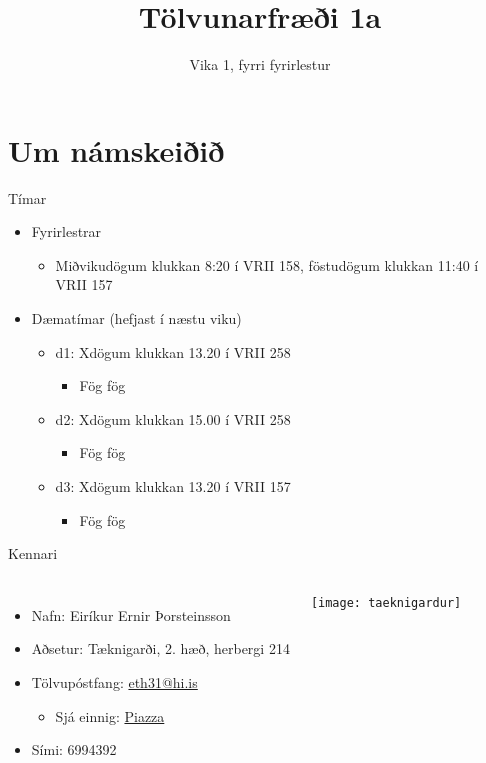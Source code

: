 \documentclass[handout]{beamer}
\title{Tölvunarfræði 1a}
\subtitle{Vika 1, fyrri fyrirlestur}
\begin{document}
\begin{frame}
\titlepage
\end{frame}

\section{Um námskeiðið}

\begin{frame}{Tímar}
\begin{itemize}
 \item Fyrirlestrar
 \begin{itemize}
  \item Miðvikudögum klukkan 8:20 í VRII 158, föstudögum klukkan 11:40 í VRII 157
 \end{itemize}
 \item Dæmatímar (hefjast í næstu viku)
 \begin{itemize}
  \item d1: Xdögum klukkan 13.20 í VRII 258
  \begin{itemize}
  \item Fög fög
  \end{itemize}
  \item d2: Xdögum klukkan 15.00 í VRII 258
  \begin{itemize}
   \item Fög fög
  \end{itemize}
  \item d3: Xdögum klukkan 13.20 í VRII 157
  \begin{itemize}
   \item Fög fög
  \end{itemize}
 \end{itemize}
\end{itemize} 
\end{frame}

\begin{frame}{Kennari}
\begin{columns}
\begin{itemize}
 \item Nafn: Eiríkur Ernir Þorsteinsson
 \item Aðsetur: Tæknigarði, 2. hæð, herbergi 214
 \item Tölvupóstfang: \href{mailto:eth31@hi.is}{eth31@hi.is}
 \begin{itemize}
  \item Sjá einnig: \hyperlink{frame:piazza}{Piazza}
 \end{itemize}
 \item Sími: 6994392
\end{itemize}
\texttt{[image: taeknigardur]}
\end{columns}
\end{frame}
\end{document}
